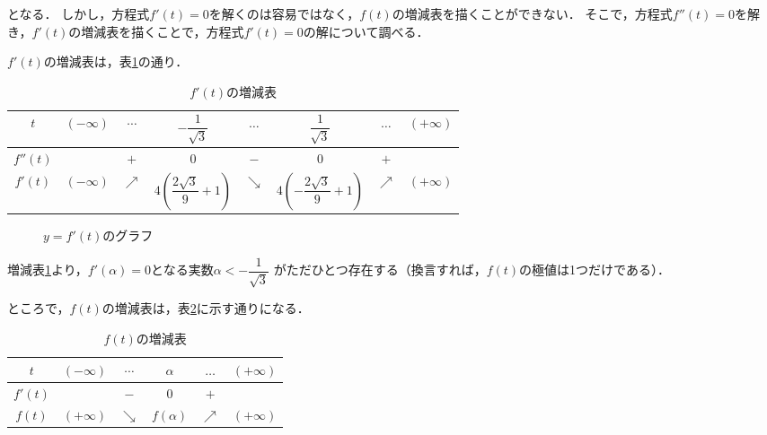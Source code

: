 \documentclass[a4paper,11pt]{jreport}
\begin{document}
となる．
しかし，方程式$f'(t) = 0$を解くのは容易ではなく，$f(t)$の増減表を描くことができない．
そこで，方程式$f''(t) = 0$を解き，$f'(t)$の増減表を描くことで，方程式$f'(t) = 0$の解について調べる．

$f'(t)$の増減表は，表\ref{tbl:second_incdec}の通り．

\begin{table}[!htbp]
  \centering
  \caption{$f'(t)$の増減表}
  \begin{tabular}{c|c|c|c|c|c|c|c|}
    $t$      & $(- \infty)$ & $\cdots$   & $- \dfrac{1}{\sqrt{3}}$                      & $\ldots$   & $\dfrac{1}{\sqrt{3}}$                          & $\ldots$   & $(+ \infty)$ \\
    \hline
    $f''(t)$ &              & $+$        & $0$                                          & $-$        & 0                                              & $+$        & \\
    \hline
    $f'(t)$  & $(- \infty)$ & $\nearrow$ & $4 \left( \dfrac{2 \sqrt{3}}{9} + 1 \right)$ & $\searrow$ & $4 \left( - \dfrac{2 \sqrt{3}}{9} + 1 \right)$ & $\nearrow$ & $(+ \infty)$ \\
  \end{tabular}
  \label{tbl:second_incdec}
\end{table}

\begin{center}
  \begin{figure}[htbp]
    \begin{center}
      \resizebox{100mm}{!}{}
      \caption{$y = f'(t)$のグラフ}
    \end{center}
  \end{figure}
\end{center}

増減表\ref{tbl:second_incdec}より，$f'(\alpha) = 0$となる実数$\alpha < -\dfrac{1}{\sqrt{3}}$ がただひとつ存在する（換言すれば，$f(t)$の極値は1つだけである）．

ところで，$f(t)$の増減表は，表\ref{tbl:first_incdec}に示す通りになる．

\begin{table}[!Hhtbp]
  \centering
  \caption{$f(t)$の増減表}
  \begin{tabular}{c||c|c|c|c|c}
    $t$      & $(- \infty)$ & $\cdots$   & $\alpha$    & $\ldots$   & $(+ \infty)$ \\
    \hline
    $f'(t)$  &              & $-$        & $0$         & $+$        & \\
    \hline
    $f(t)$   & $(+ \infty)$ & $\searrow$ & $f(\alpha)$ & $\nearrow$ & $(+ \infty)$
  \end{tabular}
  \label{tbl:first_incdec}
\end{table}
\end{document}
